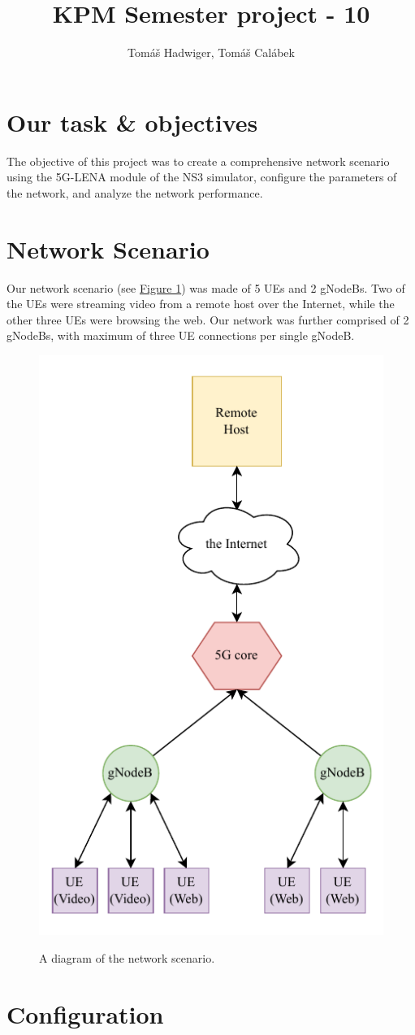 \documentclass[10pt,a4]{article}
\title{KPM Semester project - 10}
\author{Tomáš Hadwiger, Tomáš Calábek}
\date{}
\begin{document}
    \maketitle
    \section{Our task \& objectives}
    The objective of this project was to create a comprehensive network scenario using the 5G-LENA module of the NS3 simulator, configure the parameters of the network, and analyze the network performance.
    \section{Network Scenario}
    Our network scenario (see \hyperref[fig:network]{Figure 1}) was made of 5 UEs and 2 gNodeBs. Two of the UEs were streaming video from a remote host over the Internet, while the other three UEs were browsing the web.
    Our network was further comprised of 2 gNodeBs, with maximum of three UE connections per single gNodeB.
    \begin{figure}[ht!]
        \centering
        \caption{A diagram of the network scenario.}
        \includegraphics[height=0.6\textwidth]{../kpm-plots/network.pdf}
        \label{fig:network}
    \end{figure}
    \section{Configuration}
\end{document}
